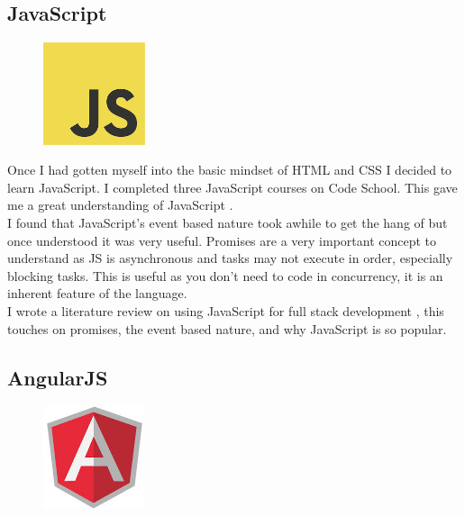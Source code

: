 \subsection{JavaScript}
\begin{figure}
\includegraphics[width=3cm]{img/mobile-app/logos/JS.png}
\end{figure} 
Once I had gotten myself into the basic mindset of HTML and CSS I decided to learn JavaScript.
I completed three JavaScript courses \cite{codeschool_js} on Code  School.
This gave me a great understanding of JavaScript \cite{javascript}.
\\
I found that JavaScript's event based nature took awhile to get the hang of but once understood it was very useful. 
Promises are a very important concept to understand as JS is asynchronous and tasks may not execute in order, especially blocking tasks.
This is useful as you don't need to code in concurrency, it is an inherent feature of the language.
\\
I wrote a literature review on using JavaScript for full stack development \cite{js_advantages_full_stack}, this touches on promises, the event based nature, and why JavaScript is so popular.

\subsection{AngularJS}
\begin{figure}
	\includegraphics[width=3cm]{img/mobile-app/logos/angular.jpg}
	\centering
\end{figure}

